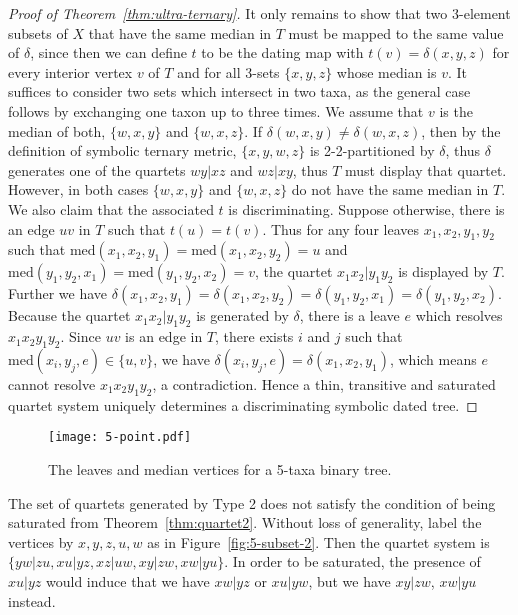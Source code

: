 \documentclass{article}
\begin{document}
\begin{proof}[Proof of Theorem~\ref{thm:ultra-ternary}]
It only remains to show that two 3-element subsets of $X$ that have the same median in $T$ must be 
mapped to the same value of $\delta$, since then we can define $t$ to be the dating map with 
$t(v)=\delta(x,y,z)$ for every interior vertex $v$ of $T$ and for all 3-sets $\{x,y,z\}$ whose median is $v$. 
It suffices to consider two sets which intersect in two taxa, as the general 
case follows by exchanging one taxon up to three times. We assume that $v$ is the median of both, 
$\{w,x,y\}$ and $\{w,x,z\}$. If $\delta(w,x,y) \neq \delta(w,x,z)$, then by the definition of
symbolic ternary metric, $\{x,y,w,z\}$ is 2-2-partitioned by $\delta$, thus $\delta$ generates one of the quartets 
$wy|xz$ and $wz|xy$, thus $T$ must display that quartet. However, in both cases $\{w,x,y\}$ and $\{w,x,z\}$ 
do not have the same median in $T$. We also claim that the associated $t$ is discriminating. Suppose otherwise,
there is an edge $uv$ in $T$ such that $t(u)=t(v)$. Thus for any four leaves $x_1,x_2,y_1,y_2$ such that
$\text{med}(x_1,x_2,y_1) = \text{med}(x_1,x_2,y_2) = u$
and $\text{med}(y_1,y_2,x_1) = \text{med}(y_1,y_2,x_2) = v$, 
the quartet $x_1x_2|y_1y_2$ is displayed by $T$.
Further we have
$\delta(x_1,x_2,y_1)=\delta(x_1,x_2,y_2)=\delta(y_1,y_2,x_1)=\delta(y_1,y_2,x_2)$.
Because the quartet $x_1x_2|y_1y_2$ is generated by $\delta$, there is a leave $e$ which resolves $x_1x_2y_1y_2$.
Since $uv$ is an edge in $T$, there exists $i$ and $j$
such that $\text{med}(x_i,y_j,e) \in \{u,v\}$, we have $\delta(x_i,y_j,e)=\delta(x_1,x_2,y_1)$,
which means $e$ cannot resolve $x_1x_2y_1y_2$, a contradiction.
Hence a thin, transitive and saturated quartet system uniquely determines a discriminating symbolic dated tree.
%
\end{proof}

\begin{figure}[ht!]
\centering  
\texttt{[image: 5-point.pdf]} 
\caption{The leaves and median vertices for a 5-taxa binary tree.} 
 \label{fig:5-point} 
\end{figure}



The set of quartets generated by Type 2 does not satisfy the condition of being saturated 
from Theorem~\ref{thm:quartet2}.
Without loss of generality, label the vertices by $x,y,z,u,w$ as in Figure~\ref{fig:5-subset-2}. 
Then the quartet system is $\{yw|zu,xu|yz,xz|uw,xy|zw,xw|yu\}$. In order 
to be saturated, the presence of $xu|yz$ would induce that we have $xw|yz$ 
or $xu|yw$, but we have $xy|zw$, $xw|yu$ instead. 
\end{document}
